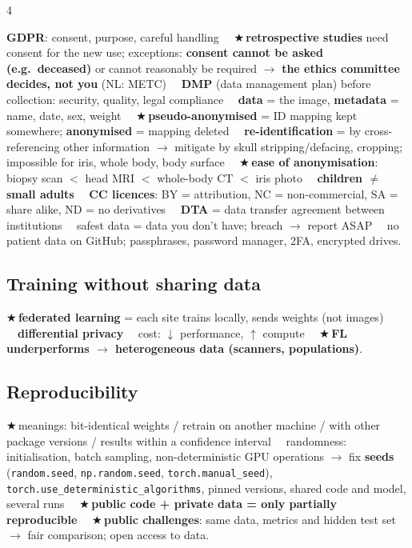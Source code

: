 \documentclass[a4paper]{article}
\renewcommand{\section}[1]{\par\vspace{2.5pt}\noindent{\setlength{\fboxsep}{1pt}\colorbox{black}{\parbox{\dimexpr\linewidth-2\fboxsep}{\color{white}\bfseries\strut#1}}}\par\vspace{1pt}}
\newcommand{\K}[1]{\textcolor{kg}{\textbf{#1}}}
\newcommand{\E}[1]{\textcolor{ep}{#1}}
\newcommand{\T}[1]{\textcolor{tr}{\textbf{#1}}}
\newcommand{\X}{\textcolor{tr}{$\bigstar$}\,}
\newcommand{\D}{\unskip\ \textbf{\textbullet}\ \ignorespaces}
\newcommand{\ra}{\ensuremath{\to}}
\newcommand{\up}{\ensuremath{\uparrow}}
\newcommand{\dn}{\ensuremath{\downarrow}}
\begin{document}
\begin{multicols*}{4}
\section{L6 Ethics, data, reproducibility}
\K{GDPR}: consent, purpose, careful handling \D \X\K{retrospective studies} need consent for the new use; exceptions: \T{consent cannot be asked (e.g.\ deceased)} or cannot reasonably be required \ra{} \T{the ethics committee decides, not you} (NL: METC) \D \K{DMP} (data management plan) before collection: security, quality, legal compliance \D \K{data} = the image, \K{metadata} = name, date, sex, weight \D \X\K{pseudo-anonymised} = ID mapping kept somewhere; \K{anonymised} = mapping deleted \D \K{re-identification} = by cross-referencing other information \ra{} mitigate by skull stripping/defacing, cropping; impossible for iris, whole body, body surface \D \X\K{ease of anonymisation}: biopsy scan $<$ head MRI $<$ whole-body CT $<$ iris photo \D \T{children $\neq$ small adults} \D \K{CC licences}: BY = attribution, NC = non-commercial, SA = share alike, ND = no derivatives \D \K{DTA} = data transfer agreement between institutions \D safest data = data you don't have; breach \ra{} report ASAP \D no patient data on GitHub; passphrases, password manager, 2FA, encrypted drives.

\subsection{Training without sharing data}
\X\K{federated learning} = each site trains locally, sends weights (not images) \D \K{differential privacy} \D cost: \dn{} performance, \up{} compute \D \X\T{FL underperforms \ra{} heterogeneous data (scanners, populations)}.

\subsection{Reproducibility}
\X meanings: bit-identical weights / retrain on another machine / with other package versions / results within a confidence interval \D randomness: initialisation, batch sampling, non-deterministic GPU operations \ra{} fix \K{seeds} (\E{\texttt{random.seed}, \texttt{np.\allowbreak random.\allowbreak seed}, \texttt{torch.\allowbreak manual\_seed}}), \E{\texttt{torch.\allowbreak use\_\allowbreak deterministic\_\allowbreak algorithms}}, pinned versions, shared code and model, several runs \D \X\T{public code + private data = only partially reproducible} \D \X\K{public challenges}: same data, metrics and hidden test set \ra{} fair comparison; open access to data.


\end{multicols*}
\end{document}
